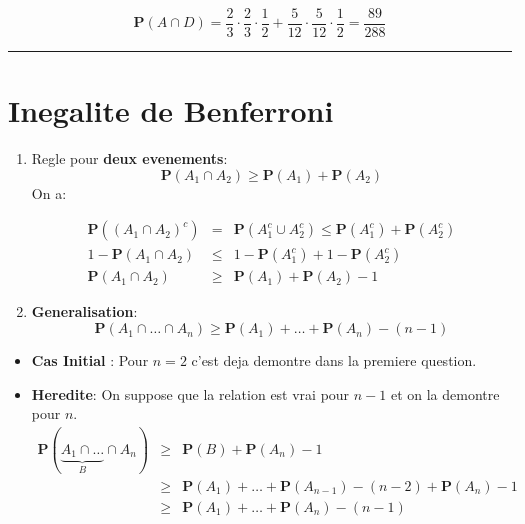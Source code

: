 \documentclass[a4paper]{tufte-handout}
\begin{document}
\begin{enumerate}
\begin{equation*}
  \mathbf{P}(A\cap D) = \frac{2}{3}\cdot\frac{2}{3}\cdot \frac{1}{2} +
  \frac{5}{12}\cdot\frac{5}{12}\cdot \frac{1}{2} = \frac{89}{288}
\end{equation*}


\end{enumerate}

\hrule

\section{Inegalite de Benferroni}

\begin{enumerate}
  \item Regle pour \textbf{deux evenements}:\\
    \begin{equation*}
    \mathbf{P}(A_1 \cap A_2) \geq \mathbf{P}(A_1)  + \mathbf{P}(A_2)
    \end{equation*}
    On a:

    \begin{eqnarray*}
      \mathbf{P}\left(\left(A_1\cap A_2\right)^c\right) &=&
      \mathbf{P}\left(A_1^c  \cup A_2^c\right)  \leq \mathbf{P}(A_1^c) +
      \mathbf{P}(A_2^c)\\
      1 - \mathbf{P}(A_1 \cap A_2) &\leq & 1 - \mathbf{P}(A_1^c)  + 1 -
      \mathbf{P}(A_2^c)\\
      \mathbf{P}(A_1 \cap A_2) &\geq& \mathbf{P}(A_1) + \mathbf{P}(A_2) - 1
    \end{eqnarray*}

  \item \textbf{Generalisation}:
    \begin{equation*}
      \mathbf{P}(A_1\cap \ldots \cap A_n) \geq \mathbf{P}(A_1) + \ldots +
      \mathbf{P}(A_n) - (n-1)
    \end{equation*}
\end{enumerate}
\begin{itemize}
  \item \textbf{Cas Initial} : Pour $n=2$ c'est deja demontre dans la premiere
    question.
  \item \textbf{Heredite}:  On suppose que la relation est vrai pour $n-1$ et on
    la demontre pour $n$.
    \begin{eqnarray*}
      \mathbf{P}(\underbrace{A_1\cap \ldots }_{B}\cap A_n)& \geq& \mathbf{P}(B) +
      \mathbf{P}(A_n) - 1 \\
                                                          &\geq &
                                                          \mathbf{P}(A_1) +
                                                          \ldots +
                                                          \mathbf{P}(A_{n-1}) -
                                                          (n-2) +
                                                          \mathbf{P}(A_n) - 1\\
                                                      & \geq & \mathbf{P}(A_1) + \ldots +
      \mathbf{P}(A_n) - (n-1)
    \end{eqnarray*}
\end{itemize}


\end{document}
